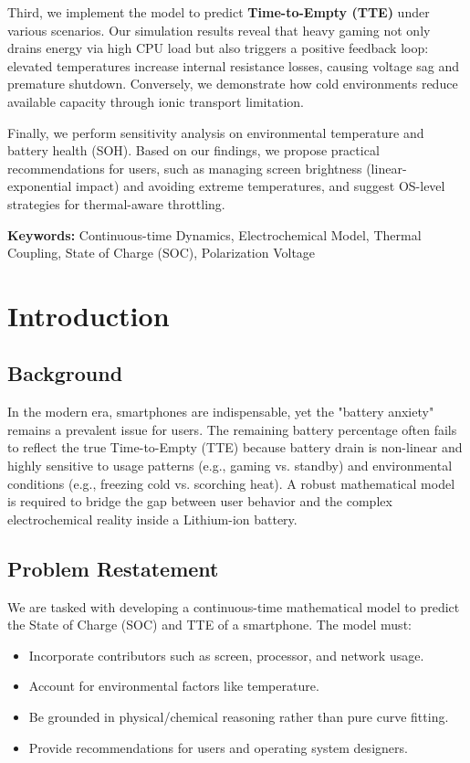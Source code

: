 \documentclass[12pt]{article}
\begin{document}
Third, we implement the model to predict \textbf{Time-to-Empty (TTE)} under various scenarios. Our simulation results reveal that heavy gaming not only drains energy via high CPU load but also triggers a positive feedback loop: elevated temperatures increase internal resistance losses, causing voltage sag and premature shutdown. Conversely, we demonstrate how cold environments reduce available capacity through ionic transport limitation.

Finally, we perform sensitivity analysis on environmental temperature and battery health (SOH). Based on our findings, we propose practical recommendations for users, such as managing screen brightness (linear-exponential impact) and avoiding extreme temperatures, and suggest OS-level strategies for thermal-aware throttling.

\vspace{1em}
\textbf{Keywords:} Continuous-time Dynamics, Electrochemical Model, Thermal Coupling, State of Charge (SOC), Polarization Voltage


\clearpage
\pagestyle{fancy}
\tableofcontents
\newpage
\setcounter{page}{1} 

\section{Introduction}

\subsection{Background}
In the modern era, smartphones are indispensable, yet the "battery anxiety" remains a prevalent issue for users. The remaining battery percentage often fails to reflect the true Time-to-Empty (TTE) because battery drain is non-linear and highly sensitive to usage patterns (e.g., gaming vs. standby) and environmental conditions (e.g., freezing cold vs. scorching heat). A robust mathematical model is required to bridge the gap between user behavior and the complex electrochemical reality inside a Lithium-ion battery.

\subsection{Problem Restatement}
We are tasked with developing a continuous-time mathematical model to predict the State of Charge (SOC) and TTE of a smartphone. The model must:
\begin{itemize}
    \item Incorporate contributors such as screen, processor, and network usage.
    \item Account for environmental factors like temperature.
    \item Be grounded in physical/chemical reasoning rather than pure curve fitting.
    \item Provide recommendations for users and operating system designers.
\end{itemize}
\end{document}
